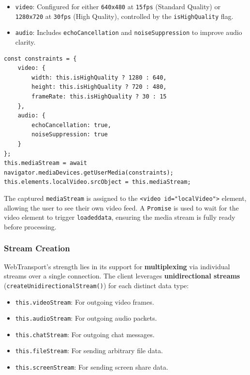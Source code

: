 \begin{itemize}
    \item \texttt{video}: Configured for either \texttt{640x480} at \texttt{15fps} (Standard Quality) or \texttt{1280x720} at \texttt{30fps} (High Quality), controlled by the \texttt{isHighQuality} flag.
    \item \texttt{audio}: Includes \texttt{echoCancellation} and \texttt{noiseSuppression} to improve audio clarity.
\end{itemize}

\begin{lstlisting}[breaklines=true,basicstyle=\small\ttfamily,frame=single]
const constraints = {
    video: {
        width: this.isHighQuality ? 1280 : 640,
        height: this.isHighQuality ? 720 : 480,
        frameRate: this.isHighQuality ? 30 : 15
    },
    audio: {
        echoCancellation: true,
        noiseSuppression: true
    }
};
this.mediaStream = await navigator.mediaDevices.getUserMedia(constraints);
this.elements.localVideo.srcObject = this.mediaStream;
\end{lstlisting}

The captured \texttt{mediaStream} is assigned to the \texttt{<video id="localVideo">} element, allowing the user to see their own video feed. A \texttt{Promise} is used to wait for the video element to trigger \texttt{loadeddata}, ensuring the media stream is fully ready before processing.

\subsubsection{Stream Creation}
WebTransport's strength lies in its support for \textbf{multiplexing} via individual streams over a single connection. The client leverages \textbf{unidirectional streams} (\texttt{createUnidirectionalStream()}) for each distinct data type:

\begin{itemize}
    \item \texttt{this.videoStream}: For outgoing video frames.
    \item \texttt{this.audioStream}: For outgoing audio packets.
    \item \texttt{this.chatStream}: For outgoing chat messages.
    \item \texttt{this.fileStream}: For sending arbitrary file data.
    \item \texttt{this.screenStream}: For sending screen share data.
\end{itemize}

